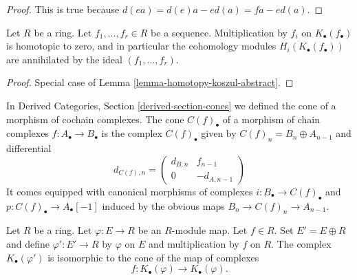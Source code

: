 \begin{proof}
This is true because $d(ea) = d(e)a - ed(a) = fa - ed(a)$.
\end{proof}

\begin{lemma}
\label{lemma-homotopy-koszul}
Let $R$ be a ring. Let $f_1, \ldots, f_r \in R$ be a sequence.
Multiplication by $f_i$ on $K_\bullet(f_\bullet)$ is homotopic to
zero, and in particular the cohomology modules $H_i(K_\bullet(f_\bullet))$
are annihilated by the ideal $(f_1, \ldots, f_r)$.
\end{lemma}

\begin{proof}
Special case of
Lemma \ref{lemma-homotopy-koszul-abstract}.
\end{proof}

\noindent
In
Derived Categories, Section \ref{derived-section-cones}
we defined the cone of a morphism of cochain complexes.
The cone $C(f)_\bullet$ of a morphism of chain complexes
$f : A_\bullet \to B_\bullet$ is the complex $C(f)_\bullet$ given by
$C(f)_n = B_n \oplus A_{n - 1}$ and differential
\begin{equation}
\label{equation-differential-cone}
d_{C(f), n} =
\left(
\begin{matrix}
d_{B, n} & f_{n - 1} \\
0 & -d_{A, n - 1}
\end{matrix}
\right)
\end{equation}
It comes equipped with canonical morphisms of complexes
$i : B_\bullet \to C(f)_\bullet$ and
$p : C(f)_\bullet \to A_\bullet[-1]$
induced by the obvious maps $B_n \to C(f)_n \to A_{n - 1}$.

\begin{lemma}
\label{lemma-cone-koszul-abstract}
Let $R$ be a ring. Let $\varphi : E \to R$ be an $R$-module map.
Let $f \in R$. Set $E' = E \oplus R$ and define $\varphi' : E' \to R$
by $\varphi$ on $E$ and multiplication by $f$ on $R$.
The complex $K_\bullet(\varphi')$ is isomorphic to the
cone of the map of complexes
$$
f :
K_\bullet(\varphi)
\longrightarrow
K_\bullet(\varphi).
$$
\end{lemma}

